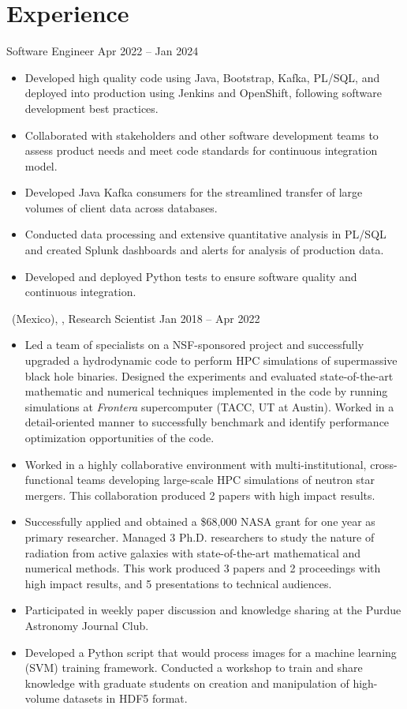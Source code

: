\section{Experience}
\cventry{}%
{\PYX}%
{Software Engineer}%
{Apr 2022 -- Jan 2024}%
{}%
{%
\begin{itemize}
    \item Developed high quality code using Java, Bootstrap, Kafka, PL/SQL, and deployed into production using Jenkins and OpenShift, following software development best practices.
    \item Collaborated with stakeholders and other software development teams to assess product needs and meet code standards for continuous integration model.
    \item Developed Java Kafka consumers for the streamlined transfer of large volumes of client data across databases.
    \item Conducted data processing and extensive quantitative analysis in PL/SQL and created Splunk dashboards and alerts for analysis of production data.
    \item Developed and deployed Python tests to ensure software quality and continuous integration.
\end{itemize}
}
\cventry{}%
{\UMSNH\ (Mexico), \Purdue, \RIT}%
{Research Scientist}%
{Jan 2018 -- Apr 2022}%
{}%
{%
\begin{itemize}
    \item Led a team of specialists on a NSF-sponsored project and successfully upgraded a hydrodynamic code to perform HPC simulations of supermassive black hole binaries. Designed the experiments and evaluated state-of-the-art mathematic and numerical techniques implemented in the code by running simulations at \emph{Frontera} supercomputer (TACC, UT at Austin). Worked in a detail-oriented manner to successfully benchmark and identify performance optimization opportunities of the code.
    \item Worked in a highly collaborative environment with multi-institutional, cross-functional teams developing large-scale HPC simulations of neutron star mergers. This collaboration produced 2 papers with high impact results.
    \item Successfully applied and obtained a \$68,000 NASA grant for one year as primary researcher. Managed 3 Ph.D. researchers to study the nature of radiation from active galaxies with state-of-the-art mathematical and numerical methods. This work produced 3 papers and 2 proceedings with high impact results, and 5 presentations to technical audiences.
    \item Participated in weekly paper discussion and knowledge sharing at the Purdue Astronomy Journal Club.
    \item Developed a Python script that would process images for a machine learning (SVM) training framework. Conducted a workshop to train and share knowledge with graduate students on creation and manipulation of high-volume datasets in HDF5 format.
\end{itemize}
}
